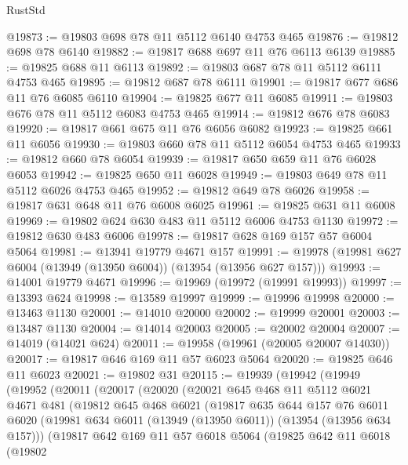 \begin{lexlean}{RustStd}
\begin{coremodule}
@19873 := @19803 @698 @78 @11 @5112 @6140 @4753 @465
@19876 := @19812 @698 @78 @6140
@19882 := @19817 @688 @697 @11 @76 @6113 @6139
@19885 := @19825 @688 @11 @6113
@19892 := @19803 @687 @78 @11 @5112 @6111 @4753 @465
@19895 := @19812 @687 @78 @6111
@19901 := @19817 @677 @686 @11 @76 @6085 @6110
@19904 := @19825 @677 @11 @6085
@19911 := @19803 @676 @78 @11 @5112 @6083 @4753 @465
@19914 := @19812 @676 @78 @6083
@19920 := @19817 @661 @675 @11 @76 @6056 @6082
@19923 := @19825 @661 @11 @6056
@19930 := @19803 @660 @78 @11 @5112 @6054 @4753 @465
@19933 := @19812 @660 @78 @6054
@19939 := @19817 @650 @659 @11 @76 @6028 @6053
@19942 := @19825 @650 @11 @6028
@19949 := @19803 @649 @78 @11 @5112 @6026 @4753 @465
@19952 := @19812 @649 @78 @6026
@19958 := @19817 @631 @648 @11 @76 @6008 @6025
@19961 := @19825 @631 @11 @6008
@19969 := @19802 @624 @630 @483 @11 @5112 @6006 @4753 @1130
@19972 := @19812 @630 @483 @6006
@19978 := @19817 @628 @169 @157 @57 @6004 @5064
@19981 := @13941 @19779 @4671 @157
@19991 := @19978 (@19981 @627 @6004 (@13949 (@13950 @6004)) (@13954 (@13956 @627 @157)))
@19993 := @14001 @19779 @4671
@19996 := @19969 (@19972 (@19991 @19993))
@19997 := @13393 @624
@19998 := @13589 @19997
@19999 := @19996 @19998
@20000 := @13463 @1130
@20001 := @14010 @20000
@20002 := @19999 @20001
@20003 := @13487 @1130
@20004 := @14014 @20003
@20005 := @20002 @20004
@20007 := @14019 (@14021 @624)
@20011 := @19958 (@19961 (@20005 @20007 @14030))
@20017 := @19817 @646 @169 @11 @57 @6023 @5064
@20020 := @19825 @646 @11 @6023
@20021 := @19802 @31
@20115 := @19939
    (@19942
      (@19949
        (@19952
          (@20011
            (@20017
              (@20020
                (@20021
                  @645
                  @468
                  @11
                  @5112
                  @6021
                  @4671
                  @481
                  (@19812
                    @645
                    @468
                    @6021
                    (@19817
                      @635
                      @644
                      @157
                      @76
                      @6011
                      @6020
                      (@19981 @634 @6011 (@13949 (@13950 @6011)) (@13954 (@13956 @634 @157)))
                      (@19817
                        @642
                        @169
                        @11
                        @57
                        @6018
                        @5064
                        (@19825
                          @642
                          @11
                          @6018
                          (@19802

\end{coremodule}
\end{lexlean}
